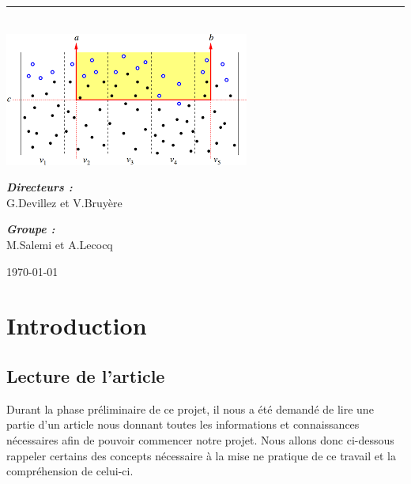 \documentclass[10pt,a4paper]{article}
\newcommand{\HRule}{\rule{\linewidth}{0.5mm}}
\begin{document}
\begin{titlepage}
\begin{sffamily}
\begin{center}
    \HRule \\[2cm]
    \includegraphics[scale=0.50]{images/window.png}
    \\[2cm]

    \begin{minipage}{0.4\textwidth}
      \begin{flushleft} \large
        \emph{\textbf{Directeurs :}}\\ G.Devillez et V.Bruyère\\
      \end{flushleft}
    \end{minipage}
    \begin{minipage}{0.4\textwidth}
      \begin{flushright} \large
        \emph{\textbf{Groupe :}}\\ M.Salemi et A.Lecocq
      \end{flushright}
    \end{minipage}

    \vfill

    {\large \today}

  \end{center}
  \end{sffamily}
\end{titlepage}

\newpage
\tableofcontents
\newpage
\section{Introduction}
    

\subsection{Lecture de l'article}
Durant la phase préliminaire de ce projet, il nous a été demandé de lire une partie d'un article nous donnant toutes les informations et connaissances nécessaires afin de pouvoir commencer notre projet. Nous allons donc ci-dessous rappeler certains des concepts nécessaire à la mise ne pratique de ce travail et la compréhension de celui-ci.
\end{document}
